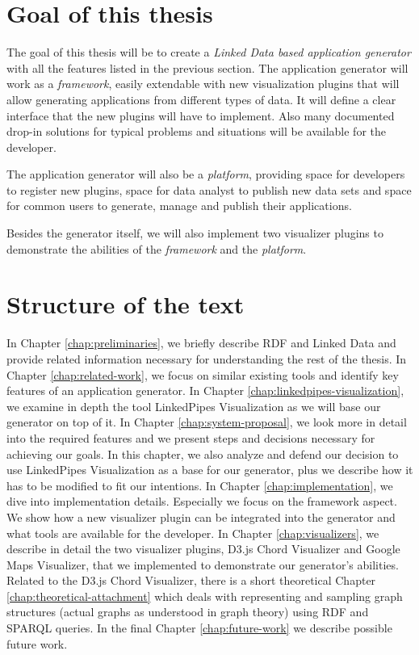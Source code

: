 \section*{Goal of this thesis}

The goal of this thesis will be to create a \emph{Linked Data based application generator} with all the features listed in the previous section. The application generator will work as a \textit{framework}, easily extendable with new visualization plugins that will allow generating applications from different types of data. It will define a clear interface that the new plugins will have to implement. Also many documented drop-in solutions for typical problems and situations will be available for the developer.

The application generator will also be a \textit{platform}, providing space for developers to register new plugins, space for data analyst to publish new data sets and space for common users to generate, manage and publish their applications.

Besides the generator itself, we will also implement two visualizer plugins to demonstrate the abilities of the \textit{framework} and the \textit{platform}.

\section*{Structure of the text}

In Chapter \ref{chap:preliminaries}, we briefly describe RDF and Linked Data and provide related information necessary for understanding the rest of the thesis. In Chapter \ref{chap:related-work}, we focus on similar existing tools and identify key features of an application generator. In Chapter \ref{chap:linkedpipes-visualization}, we examine in depth the tool LinkedPipes Visualization as we will base our generator on top of it.  In Chapter \ref{chap:system-proposal}, we look more in detail into the required features and we present steps and decisions necessary for achieving our goals. In this chapter, we also analyze and defend our decision to use LinkedPipes Visualization as a base for our generator, plus we describe how it has to be modified to fit our intentions. In Chapter \ref{chap:implementation}, we dive into implementation details. Especially we focus on the framework aspect. We show how a new visualizer plugin can be integrated into the generator and what tools are available for the developer. In Chapter \ref{chap:visualizers}, we describe in detail the two visualizer plugins, D3.js Chord Visualizer and Google Maps Visualizer, that we implemented to demonstrate our generator's abilities. Related to the D3.js Chord Visualizer, there is a short theoretical Chapter \ref{chap:theoretical-attachment} which deals with representing and sampling graph structures (actual graphs as understood in graph theory) using RDF and SPARQL queries. In the final Chapter \ref{chap:future-work} we describe possible future work.